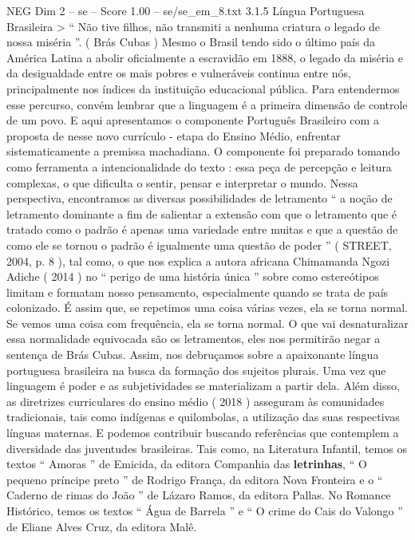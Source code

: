 \begin{textsample}{NEG Dim 2 – se – Score 1.00 – se/se\_em\_8.txt}  \label{ex:f2_neg_265}
3.1.5 Língua Portuguesa Brasileira > “ Não tive filhos, não transmiti a nenhuma criatura o legado de nossa miséria ”. ( Brás Cubas ) Mesmo o Brasil tendo sido o último país da América Latina a abolir oficialmente a escravidão em 1888, o legado da miséria e da desigualdade entre os mais pobres e vulneráveis continua entre nós, principalmente nos índices da instituição educacional pública.
Para entendermos esse percurso, convém lembrar que a linguagem é a primeira dimensão de controle de um povo.
E aqui apresentamos o componente Português Brasileiro com a proposta de nesse novo currículo - etapa do Ensino Médio, enfrentar sistematicamente a premissa machadiana.
O componente foi preparado tomando como ferramenta a intencionalidade do texto : essa peça de percepção e leitura complexas, o que dificulta o sentir, pensar e interpretar o mundo.
Nessa perspectiva, encontramos as diversas possibilidades de letramento “ a noção de letramento dominante a fim de salientar a extensão com que o letramento que é tratado como o padrão é apenas uma variedade entre muitas e que a questão de como ele se tornou o padrão é igualmente uma questão de poder ” ( STREET, 2004, p. 8 ), tal como, o que nos explica a autora africana Chimamanda Ngozi Adiche ( 2014 ) no “ perigo de uma história única ” sobre como estereótipos limitam e formatam nosso pensamento, especialmente quando se trata de país colonizado.
É assim que, se repetimos uma coisa várias vezes, ela se torna normal.
Se vemos uma coisa com frequência, ela se torna normal.
O que vai desnaturalizar essa normalidade equivocada são os letramentos, eles nos permitirão negar a sentença de Brás Cubas.
Assim, nos debruçamos sobre a apaixonante língua portuguesa brasileira na busca da formação dos sujeitos plurais.
Uma vez que linguagem é poder e as subjetividades se materializam a partir dela.
Além disso, as diretrizes curriculares do ensino médio ( 2018 ) asseguram às comunidades tradicionais, tais como indígenas e quilombolas, a utilização das suas respectivas línguas maternas.
E podemos contribuir buscando referências que contemplem a diversidade das juventudes brasileiras.
Tais como, na Literatura Infantil, temos os textos “ Amoras ” de Emicida, da editora Companhia das \textbf{letrinhas}, “ O pequeno príncipe preto ” de Rodrigo França, da editora Nova Fronteira e o “ Caderno de rimas do João ” de Lázaro Ramos, da editora Pallas.
No Romance Histórico, temos os textos “ Água de Barrela ” e “ O crime do Cais do Valongo ” de Eliane Alves Cruz, da editora Malê.

\end{textsample}

